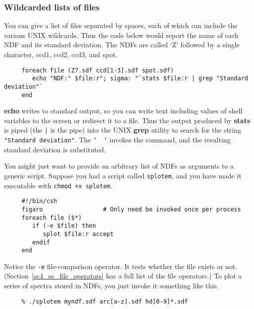 \documentclass[twoside,11pt]{article}
\newcommand{\htmlref}[2]{#1}
\newcommand{\xref}[3]{#1}
\newcommand{\xlabel}[1]{}
\newcommand{\latexelsehtml}[2]{#1}
\newcommand{\latexelsehtml}[2]{#2}
\newcommand{\NDFref}[1]{\xref{#1}{sun33}{}}
\begin{document}
\subsubsection{\xlabel{sc4_se_wildcard_lists}Wildcarded lists of files
\label{sc4_se_wildcard_lists}}

You can give a list of files separated by spaces, each of which can
include the various UNIX \htmlref{{\sf wildcards}}{sc4_gl_wild}.  Thus
the code below would report the name of each \NDFref{{\sf NDF}} and
its standard deviation. The NDFs are called `Z' followed by a single
character, ccd1, ccd2, ccd3, and spot.

\small
\begin{verbatim}
     foreach file (Z?.sdf ccd[1-3].sdf spot.sdf)
        echo "NDF:" $file:r"; sigma: "`stats $file:r | grep "Standard deviation"`
     end
\end{verbatim}
\normalsize

{\bf echo} writes to \htmlref{{\sf standard output}}{sc4_gl_std_out},
so you can write text including values of \htmlref{shell
variables}{sc4_se_variables} to the screen or redirect it to a file.
Thus the output produced by \xref{{\bf stats}}{sun95}{STATS} is
\htmlref{{\sf piped}}{sc4_gl_pipe} (the {\tt |} is the \htmlref{{\sf
pipe}}{sc4_gl_pipe}) into the UNIX {\bf grep} utility to search for
the string {\tt "Standard deviation"}.  The {\tt `~~`} invokes the
command, and the resulting standard deviation is substituted.
\medskip

You might just want to provide an arbitrary list of NDFs as arguments to
a generic script.  Suppose you had a script called {\tt splotem}, and
you have made it executable with \mbox{\tt chmod +x splotem}.

\small
\begin{verbatim}
     #!/bin/csh
     figaro                 # Only need be invoked once per process
     foreach file ($*) 
        if (-e $file) then
           splot $file:r accept
        endif
     end
\end{verbatim}
\normalsize

Notice the {\tt -e} file-comparison operator.  It tests whether the
file exists or not.  (\latexelsehtml{Section~\ref{sc4_se_file_operators}
has a}{Click \htmlref{here}{sc4_se_file_operators} for a} full list of
the file operators.) To plot a series of spectra stored in NDFs, you
just invoke it something like this.

\small
\begin{verbatim}
     % ./splotem myndf.sdf arc[a-z].sdf hd[0-9]*.sdf
\end{verbatim}
\normalsize
\end{document}
